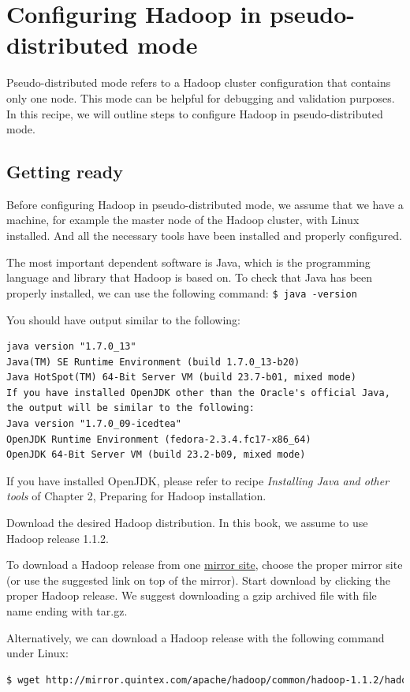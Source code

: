 \section{Configuring Hadoop in pseudo-distributed mode}
Pseudo-distributed mode refers to a Hadoop cluster configuration that contains only one node. This mode can be helpful for debugging and validation purposes. In this recipe, we will outline steps to configure Hadoop in pseudo-distributed mode.
\subsection*{Getting ready}
Before configuring Hadoop in pseudo-distributed mode, we assume that we have a machine, for example the master node of the Hadoop cluster, with Linux installed. And all the necessary tools have been installed and properly configured.

The most important dependent software is Java, which is the programming language and library that Hadoop is based on. To check that Java has been properly installed,
we can use the following command:
\verb|$ java -version|

You should have output similar to the following:
\lstset{style=bashstyle}
\begin{lstlisting}
java version "1.7.0_13"
Java(TM) SE Runtime Environment (build 1.7.0_13-b20)
Java HotSpot(TM) 64-Bit Server VM (build 23.7-b01, mixed mode)
If you have installed OpenJDK other than the Oracle's official Java, the output will be similar to the following:
Java version "1.7.0_09-icedtea"
OpenJDK Runtime Environment (fedora-2.3.4.fc17-x86_64)
OpenJDK 64-Bit Server VM (build 23.2-b09, mixed mode)
\end{lstlisting}
If you have installed OpenJDK, please refer to recipe \emph{Installing Java and other tools} of Chapter 2, Preparing for Hadoop installation.

Download the desired Hadoop distribution. In this book, we assume to use Hadoop release 1.1.2.

To download a Hadoop release from one \href{http://www.apache.org/dyn/closer.cgi/hadoop/common/}{mirror site}, choose the proper mirror site (or use the suggested link on top of the mirror). Start download by clicking the proper Hadoop release. We suggest downloading a gzip archived file with file name ending with tar.gz.

Alternatively, we can download a Hadoop release with the following command under Linux:
\lstset{style=bashstyle}
\begin{lstlisting}[language=bash]
$ wget http://mirror.quintex.com/apache/hadoop/common/hadoop-1.1.2/hadoop-1.1.2.tar.gz -P ~
\end{lstlisting}

